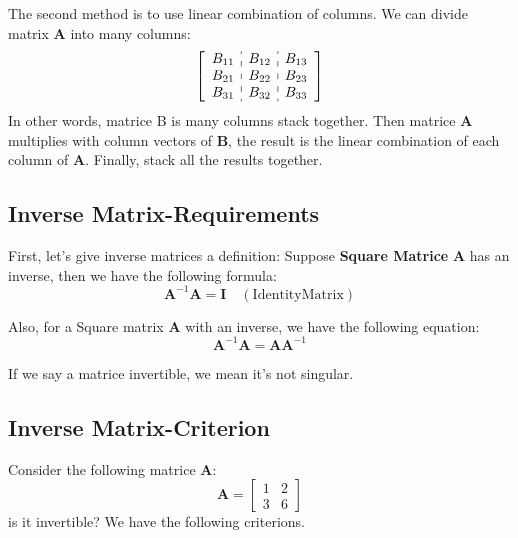         The second method is to use linear combination of columns. We can divide matrix \textbf{A} into many columns:
            \begin{equation}
                 \left[
                    \begin{array}{c:c:c}
                    B_{11} & B_{12} & B_{13} \\
                    B_{21} & B_{22} & B_{23} \\
                    B_{31} & B_{32} & B_{33} \\
                    \end{array}
                    \right]
            \end{equation}
        In other words, matrice B is many columns stack together.
        Then matrice \textbf{A} multiplies with  column vectors of \textbf{B}, the result is the linear combination of each column of \textbf{A}.
        Finally, stack all the results together.
        
    \subsection{Inverse Matrix-Requirements}
        First, let's give inverse matrices a definition:
        Suppose \textbf{Square Matrice} \textbf{A} has an inverse, then we have the following formula:
            \begin{equation}
                \mathbf{A}^{-1} \mathbf{A} = \mathbf{I}\quad (\mathrm{Identity Matrix})
            \end{equation}
        
        Also, for a Square matrix \textbf{A} with an inverse, we have the following equation:
            \begin{equation}
                \mathbf{A}^{-1} \mathbf{A} = \mathbf{A} \mathbf{A}^{-1}
            \end{equation}
        
        If we say a matrice invertible, we mean it's not singular.
        
    \subsection{Inverse Matrix-Criterion}
        Consider the following matrice \textbf{A}:
            \begin{equation}
                \textbf{A} = 
                \begin{bmatrix}
                    1 & 2\\
                    3 & 6
                \end{bmatrix}
            \end{equation}
        is it invertible? We have the following criterions.

